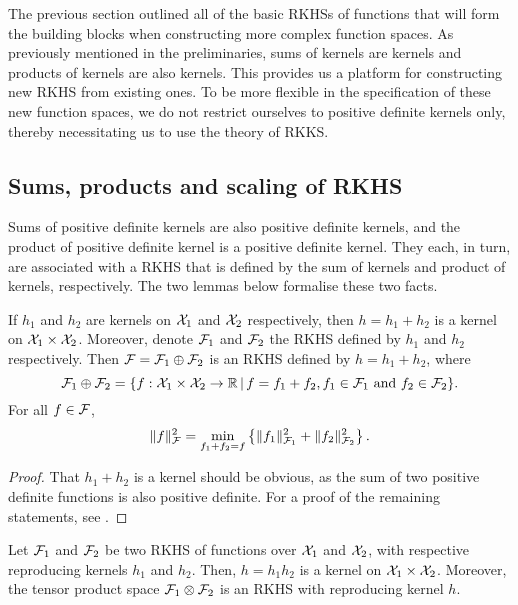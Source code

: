 
The previous section outlined all of the basic RKHSs of functions that will form the building blocks when constructing more complex function spaces.
As previously mentioned in the preliminaries, sums of kernels are kernels and products of kernels are also kernels. 
This provides us a platform for constructing new RKHS from existing ones.
To be more flexible in the specification of these new function spaces, we do not restrict ourselves to positive definite kernels only, thereby necessitating us to use the theory of RKKS.

\subsection{Sums, products and scaling of RKHS}

Sums of positive definite kernels are also positive definite kernels, and the product of positive definite kernel is a positive definite kernel.
They each, in turn, are associated with a RKHS that is defined by the sum of kernels and product of kernels, respectively.
The two lemmas below formalise these two facts. 

\begin{lemma}\label{thm:sumkernels}
  If $h_1$ and $h_2$ are kernels on ${\mathcal X}_1$ and ${\mathcal X}_2$ respectively, then $h = h_1 + h_2$ is a kernel on ${\mathcal X}_1 \times {\mathcal X}_2$.
  Moreover, denote ${\mathcal F}_1$ and ${\mathcal F}_2$ the RKHS defined by $h_1$ and $h_2$ respectively.
  Then ${\mathcal F} = {\mathcal F}_1 \oplus {\mathcal F}_2$ is an RKHS defined by $h = h_1 + h_2$, where
  \[
    {\mathcal F}_1 \oplus {\mathcal F}_2 = \{ f:{\mathcal X}_1\times{\mathcal X}_2 \to\mathbb{R} \,|\, f = f_1 + f_2, f_1\in{\mathcal F}_1 \text{ and } f_2\in{\mathcal F}_2 \}.
  \]
  For all $f\in{\mathcal F}$,
  \[
    \lVert f\rVert_{\mathcal F}^2 = \min_{f_1+f_2=f} \left\{ \lVert f_1\rVert_{{\mathcal F}_1}^2 + \lVert f_2\rVert_{{\mathcal F}_2}^2 \right\}.
  \]
\end{lemma}

\begin{proof}
  That $h_1+h_2$ is a kernel should be obvious, as the sum of two positive definite functions is also positive definite.
  For a proof of the remaining statements, see \citet[Theorem 5]{berlinet2011reproducing}.
\end{proof}

\begin{lemma}\label{thm:prodkernels}
  Let ${\mathcal F}_1$ and ${\mathcal F}_2$ be two RKHS of functions over ${\mathcal X}_1$ and ${\mathcal X}_2$, with respective reproducing kernels $h_1$ and $h_2$.
  Then, $h = h_1 h_2$ is a kernel on ${\mathcal X}_1 \times {\mathcal X}_2$.
  Moreover, the tensor product space ${\mathcal F}_1 \otimes {\mathcal F}_2$ is an RKHS with reproducing kernel $h$.
\end{lemma}

